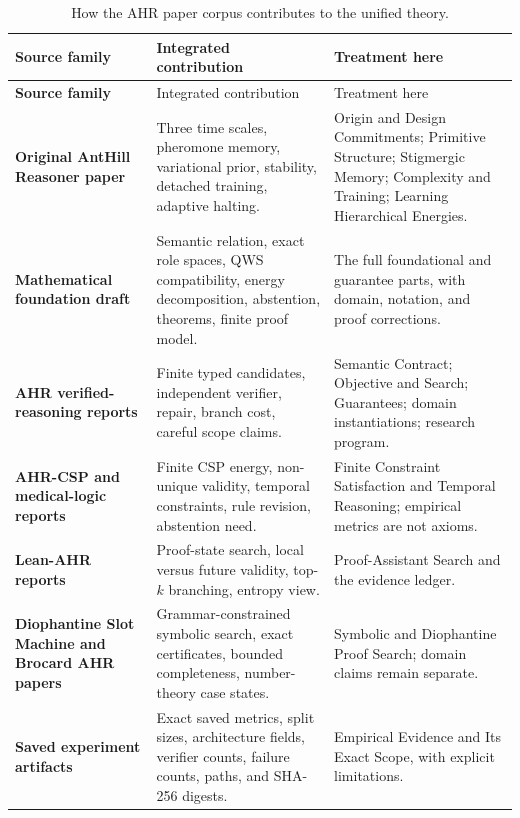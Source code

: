 \documentclass[11pt,oneside]{book}
\theoremstyle{remark}
\begin{document}
\begin{longtable}{>{\bfseries\RaggedRight\arraybackslash}p{}
>{\RaggedRight\arraybackslash}p{}
>{\RaggedRight\arraybackslash}p{}}
\caption{How the AHR paper corpus contributes to the unified theory.}\\
\toprule
Source family & Integrated contribution & Treatment here \\
\midrule
\endfirsthead
\toprule
Source family & Integrated contribution & Treatment here \\
\midrule
\endhead
Original AntHill Reasoner paper \cite{FalkenburgAHRDesign2026} & Three time scales, pheromone memory, variational prior, stability, detached training, adaptive halting. & Origin and Design Commitments; Primitive Structure; Stigmergic Memory; Complexity and Training; Learning Hierarchical Energies. \\
Mathematical foundation draft \cite{FalkenburgAHRFoundation2026} & Semantic relation, exact role spaces, QWS compatibility, energy decomposition, abstention, theorems, finite proof model. & The full foundational and guarantee parts, with domain, notation, and proof corrections. \\
AHR verified-reasoning reports \cite{FalkenburgVerified2026} & Finite typed candidates, independent verifier, repair, branch cost, careful scope claims. & Semantic Contract; Objective and Search; Guarantees; domain instantiations; research program. \\
AHR-CSP and medical-logic reports \cite{FalkenburgAHRCSP2026} & Finite CSP energy, non-unique validity, temporal constraints, rule revision, abstention need. & Finite Constraint Satisfaction and Temporal Reasoning; empirical metrics are not axioms. \\
Lean-AHR reports \cite{FalkenburgLeanAHR2026} & Proof-state search, local versus future validity, top-$k$ branching, entropy view. & Proof-Assistant Search and the evidence ledger. \\
Diophantine Slot Machine and Brocard AHR papers & Grammar-constrained symbolic search, exact certificates, bounded completeness, number-theory case states. & Symbolic and Diophantine Proof Search; domain claims remain separate. \\
Saved experiment artifacts \cite{FalkenburgExperimentArchive2026,FalkenburgSudokuLocalBundle2026,FalkenburgProvenanceManifest2026} & Exact saved metrics, split sizes, architecture fields, verifier counts, failure counts, paths, and SHA-256 digests. & Empirical Evidence and Its Exact Scope, with explicit limitations. \\

\end{longtable}
\end{document}
